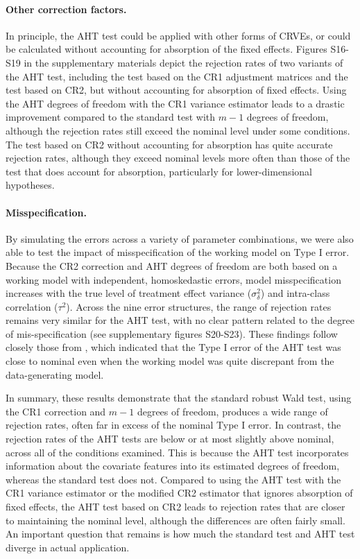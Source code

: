 \documentclass[12pt]{article}\usepackage[]{graphicx}\usepackage[]{color}
\begin{document}
\paragraph{Other correction factors.} 
In principle, the AHT test could be applied with other forms of CRVEs, or could be calculated without accounting for absorption of the fixed effects. 
Figures S16-S19 in the supplementary materials depict the rejection rates of two variants of the AHT test, including the test based on the CR1 adjustment matrices and the test based on CR2, but without accounting for absorption of fixed effects. 
Using the AHT degrees of freedom with the CR1 variance estimator leads to a drastic improvement compared to the standard test with $m - 1$ degrees of freedom, although the rejection rates still exceed the nominal level under some conditions.
The test based on CR2 without accounting for absorption has quite accurate rejection rates, although they exceed nominal levels more often than those of the test that does account for absorption, particularly for lower-dimensional hypotheses. 

\paragraph{Misspecification.} By simulating the errors across a variety of parameter combinations, we were also able to test the impact of misspecification of the working model on Type I error.
Because the CR2 correction and AHT degrees of freedom are both based on a working model with independent, homoskedastic errors, model misspecification increases with the true level of treatment effect variance ($\sigma_\delta^2$) and intra-class correlation ($\tau^2$).
Across the nine error structures, the range of rejection rates remains very similar for the AHT test, with no clear pattern related to the degree of mis-specification (see supplementary figures S20-S23). 
These findings follow closely those from , which indicated that the Type I error of the AHT test was close to nominal even when the working model was quite discrepant from the data-generating model.

In summary, these results demonstrate that the standard robust Wald test, using the CR1 correction and $m - 1$ degrees of freedom, produces a wide range of rejection rates, often far in excess of the nominal Type I error. 
In contrast, the rejection rates of the AHT tests are below or at most slightly above nominal, across all of the conditions examined. 
This is because the AHT test incorporates information about the covariate features into its estimated degrees of freedom, whereas the standard test does not.
Compared to using the AHT test with the CR1 variance estimator or the modified CR2 estimator that ignores absorption of fixed effects, the AHT test based on CR2 leads to rejection rates that are closer to maintaining the nominal level, although the differences are often fairly small. 
An important question that remains is how much the standard test and AHT test diverge in actual application.
\end{document}
